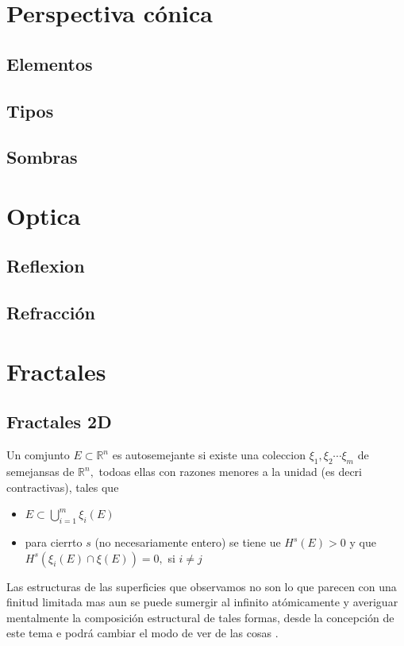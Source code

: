\documentclass[a4paper]{book}
\newcommand{\Real}{\mathbb R}
\newcommand{\pa}[1]{\left(#1\right)}
\begin{document}
\chapter{Perspectiva cónica}

\section{Elementos}
\section{Tipos}
\section{Sombras}

\chapter{Optica}

\section{Reflexion}

\section{Refracción}


\chapter{Fractales}

\section{Fractales 2D}


Un comjunto $E\subset \Real^n$ es autosemejante si existe una coleccion $\xi_1,\xi_2 \cdots \xi_m$ de semejansas de $\Real^n,$ todoas ellas con razones menores a la unidad (es decri contractivas), tales que

\begin{itemize}
	\item $E\subset \bigcup^m_{i=1}\xi_i\pa{E}$
	\item para cierrto $s$ (no necesariamente entero) se tiene ue $H^s\pa{E}>0$ y que $H^s\pa{\xi_i\pa{E}\cap \xi\pa{E}}=0,$ si $i\neq j$
\end{itemize}

Las estructuras de las superficies que observamos no son lo que parecen con una finitud limitada mas aun se puede sumergir al infinito atómicamente y averiguar mentalmente la composición estructural de tales formas, desde  la concepción de este tema e podrá cambiar el modo de ver de las cosas .
\end{document}
